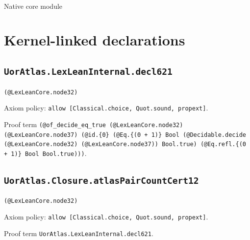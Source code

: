 \documentclass[11pt]{article}
\begin{document}
\begin{center}{\LARGE Native core module}\end{center}
\section*{Kernel-linked declarations}
\subsection*{\texttt{UorAtlas.LexLeanInternal.decl621}}
\noindent\texttt{(@LexLeanCore.node32)}\par
\noindent Axiom policy: \texttt{allow [Classical.choice, Quot.sound, propext]}.\par
\noindent Proof term \texttt{(@of\_decide\_eq\_true (@LexLeanCore.node32) (@LexLeanCore.node37) (@id.\{0\} (@Eq.\{(0 + 1)\} Bool (@Decidable.decide (@LexLeanCore.node32) (@LexLeanCore.node37)) Bool.true) (@Eq.refl.\{(0 + 1)\} Bool Bool.true)))}.\par
\subsection*{\texttt{UorAtlas.Closure.atlasPairCountCert12}}
\noindent\texttt{(@LexLeanCore.node32)}\par
\noindent Axiom policy: \texttt{allow [Classical.choice, Quot.sound, propext]}.\par
\noindent Proof term \texttt{UorAtlas.LexLeanInternal.decl621}.\par
\end{document}
